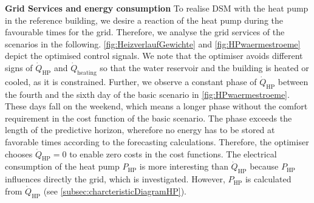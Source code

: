 \textbf{Grid Services and energy consumption}\newline
To realise DSM with the heat pump in the reference building, we desire a reaction of the heat pump during the favourable times for the grid. Therefore, we analyse the grid services of the scenarios in the following.\newline
\autoref{fig:HeizverlaufGewichte} and \autoref{fig:HPwaermestroeme} depict the optimised control signals. We note that the optimiser avoids different signs of $\dot{Q}_\text{HP}$ and $\dot{Q}_\text{heating}$ so that the water reservoir and the building is heated or cooled, as it is constrained. Further, we observe a constant phase of $\dot{Q}_\text{HP}$ between the fourth and the sixth day of the basic scenario in \autoref{fig:HPwaermestroeme}. These days fall on the weekend, which means a longer phase without the comfort requirement in the cost function of the basic scenario. The phase exceeds the length of the predictive horizon, wherefore no energy has to be stored at favorable times according to the forecasting calculations. Therefore, the optimiser chooses $\dot{Q}_\text{HP} = 0$ to enable zero costs in the cost functions.\newline
The electrical consumption of the heat pump $P_\text{HP}$ is more interesting than $\dot{Q}_\text{HP}$ because $P_\text{HP}$ influences directly the grid, which is investigated. However, $P_\text{HP}$ is calculated from $\dot{Q}_\text{HP}$ (see \autoref{subsec:charcteristicDiagramHP}).\newline
